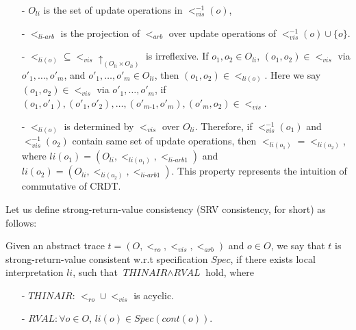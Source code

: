 \begin{itemize}
\setlength{\itemsep}{0.5pt}
\item[-] {\color {red}$O_{li}$ is the set of update operations in $<_{\textit{vis}}^{-1}(o)$,}

\item[-] {\color {red}$<_{\textit{li-arb}}$ is the projection of $<_{\textit{arb}}$ over update operations of $<_{\textit{vis}}^{-1}(o) \cup \{ o \}$. }

\item[-] $<_{li(o)} \subseteq <_{\textit{vis}} \uparrow_{(O_{li} \times O_{li})}$ is irreflexive. {\color {red}If $o_1,o_2 \in O_{li}$, $(o_1,o_2) \in <_{\textit{vis}}$ via $o'_1,\ldots,o'_m$, and $o'_1,\ldots,o'_m \in O_{li}$, then $(o_1,o_2) \in <_{li(o)}$.} Here we say $(o_1,o_2) \in <_{\textit{vis}}$ via $o'_1,\ldots,o'_m$, if $(o_1,o'_1),(o'_1,o'_2),\ldots,(o'_{\textit{m-1}},o'_m),(o'_m,o_2) \in <_{\textit{vis}}$.

\item[-] {\color {red} $<_{li(o)}$ is determined by $<_{\textit{vis}}$ over $O_{li}$. Therefore, if $<_{\textit{vis}}^{-1}(o_1)$ and $<_{\textit{vis}}^{-1}(o_2)$ contain same set of update operations, then $<_{li(o_1)} = <_{li(o_2)}$,} where $li(o_1) = ( O_{li} ,<_{li(o_1)}, <_{\textit{li-arb1}} )$ and $li(o_2) = ( O_{li} ,<_{li(o_2)}, <_{\textit{li-arb1}} )$. This property represents the intuition of commutative of CRDT.
\end{itemize}

Let us define strong-return-value consistency (SRV consistency, for short) as follows:


\begin{definition}
\label{definition:strong return value consistency}
Given an abstract trace $t = (O,<_{\textit{ro}},<_{\textit{vis}},<_{\textit{arb}})$ and $o \in O$, we say that $t$ is strong-return-value consistent w.r.t specification $Spec$, if there exists local interpretation $li$, such that $\textit{THINAIR} \wedge \textit{RVAL}$ hold, where

\begin{itemize}
\setlength{\itemsep}{0.5pt}
\item[-] $\textit{THINAIR}$: $<_{\textit{ro}} \cup <_{\textit{vis}}$ is acyclic.

\item[-] $\textit{RVAL}: \forall o \in O$, $li(o) \in Spec(cont(o))$.
\end{itemize}
\end{definition}


